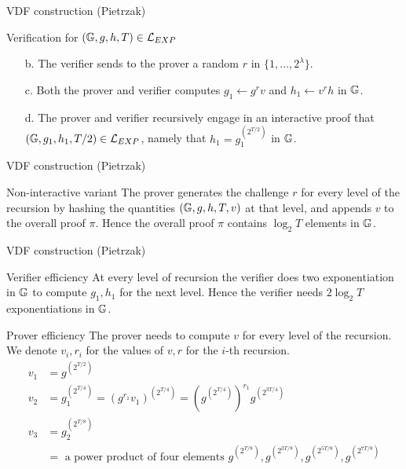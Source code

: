 \documentclass[UTF8]{beamer}
\begin{document}
	\begin{frame}{VDF construction (Pietrzak)}
		\begin{block}{Verification for $(\mathbb{G},g,h,T)\in\mathcal{L}_{EXP}$}
			\begin{enumerate}
				\item [b.] The verifier sends to the prover a random $r$ in $\{1,\dots,2^\lambda\}$.
				\item [c.] Both the prover and verifier computes $g_1\gets g^rv$ and $h_1\gets v^rh$ in $\mathbb{G}$.
				\item [d.] The prover and verifier recursively engage in an interactive proof that $(\mathbb{G},g_1,h_1,T/2)\in\mathcal{L}_{EXP}$, namely that $h_1=g_1^{(2^{T/2})}$ in $\mathbb{G}$.
			\end{enumerate}
		\end{block}
	\end{frame}

	\begin{frame}{VDF construction (Pietrzak)}
		\begin{block}{Non-interactive variant}
			The prover generates the challenge $r$ for every level of the recursion by hashing the quantities $(\mathbb{G},g,h,T,v)$ at that level, and appends $v$ to the overall proof $\pi$. Hence the overall proof $\pi$ contains $\log_2T$ elements in $\mathbb{G}$.
		\end{block}
	\end{frame}

	\begin{frame}{VDF construction (Pietrzak)}
		\begin{block}{Verifier efficiency}
			At every level of recursion the verifier does two exponentiation in $\mathbb{G}$ to compute $g_1,h_1$ for the next level. Hence the verifier needs $2\log_2T$ exponentiations in $\mathbb{G}$.
		\end{block}
		\begin{block}{Prover efficiency}
			The prover needs to compute $v$ for every level of the recursion. We denote $v_i,r_i$ for the values of $v,r$ for the $i$-th recursion.
			\begin{equation*}
				\begin{aligned}
					v_1&=g^{(2^{T/2})}\\
					v_2&=g_1^{(2^{T/4})}=(g^{r_1}v_1)^{(2^{T/4})}=\left( g^{(2^{T/4})}\right)^{r_1}g^{(2^{3T/4})}\\
					v_3&=g_2^{(2^{T/8})}\\
					&=\text{ a power product of four elements } g^{(2^{T/8})}, g^{(2^{3T/8})}, g^{(2^{5T/8})}, g^{(2^{7T/8})}
				\end{aligned}
			\end{equation*}
		\end{block}
	\end{frame}
\end{document}
